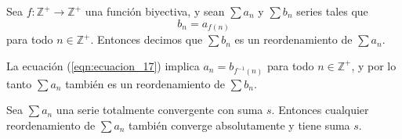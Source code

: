 \begin{definition}
  Sea $f: \mathbb{Z}^{+} \rightarrow \mathbb{Z}^{+}$ una función biyectiva, y sean $\sum a_{n}$ y $\sum b_{n}$ series tales que 
  \begin{equation}\label{eqn:ecuacion_17}
  b_{n}=a_{f(n)}
  \end{equation}
  para todo $n \in \mathbb{Z}^{+}$. Entonces decimos que $\sum b_{n}$ es un reordenamiento de $\sum a_n$.
\end{definition}
\begin{remark}
  La ecuación (\ref{eqn:ecuacion_17}) implica $a_{n}=b_{f^{-1}(n)}$ para todo $n \in \mathbb{Z}^{+}$, y por lo tanto $\sum a_{n}$ también es un reordenamiento de $\sum b_{n}$.
\end{remark}
\begin{theorem}
  Sea $\sum a_{n}$ una serie totalmente convergente con suma $s$. Entonces cualquier reordenamiento de $\sum a_{n}$ también converge absolutamente y tiene suma $s$.
\end{theorem}
